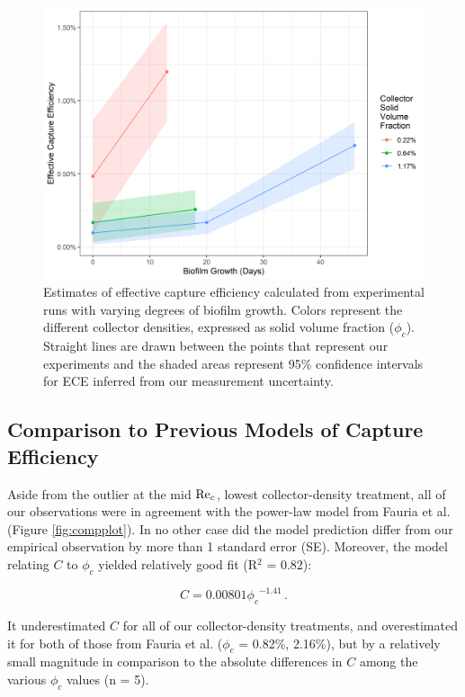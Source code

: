 \documentclass[geosciences,article,submit,moreauthors,pdftex]{Definitions/mdpi}
\begin{document}
\begin{figure}[H]
\centering
\includegraphics[width=5in]{../pics/biofilm.png}
\caption{Estimates of effective capture efficiency calculated from experimental runs with varying degrees of biofilm growth. Colors represent the different collector densities, expressed as solid volume fraction ($\phi_c$). Straight lines are drawn between the points that represent our experiments and the shaded areas represent 95\% confidence intervals for ECE inferred from our measurement uncertainty.}
\label{fig:biofilm}
\end{figure}   

\subsection{Comparison to Previous Models of Capture Efficiency}

Aside from the outlier at the mid $\mathrm{Re}_c$, lowest collector-density treatment, all of our observations were in agreement with the power-law model from Fauria et al. \cite{Fauria_2015} (Figure \ref{fig:compplot}). In no other case did the model prediction differ from our empirical observation by more than 1 standard error (SE). Moreover, the model relating $C$ to $\phi_c$ yielded relatively good fit (R$^2$ = 0.82):

\begin{equation}
    C = 0.00801{\phi_c}^{-1.41}\,.
\end{equation}

\noindent It underestimated $C$ for all of our collector-density treatments, and overestimated it for both of those from Fauria et al. ($\phi_c$ = 0.82\%, 2.16\%), but by a relatively small magnitude in comparison to the absolute differences in $C$ among the various $\phi_c$ values (n = 5).
\end{document}
